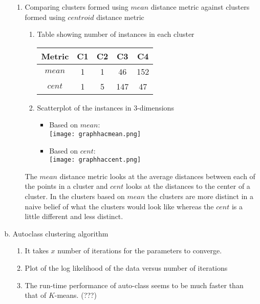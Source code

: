 \documentclass[11pt]{article}
\begin{document}
\begin{enumerate}[a.]
\begin{enumerate}
\item Comparing clusters formed using $mean$ distance metric against clusters formed using $centroid$ distance metric
\begin{enumerate}
\item Table showing number of instances in each cluster\\
\begin{tabular}{|c|c|c|c|c|}
\hline
Metric & C1 & C2 & C3 & C4\\ \hline
$mean$ & 1 & 1 & 46 & 152\\ \hline
$cent$ & 1 & 5 & 147 & 47\\
\hline
\end{tabular}
\item Scatterplot of the instances in 3-dimensions
\begin{itemize}
	\item Based on $mean$:\\
	\texttt{[image: graphhacmean.png]}
	\item Based on $cent$:\\
	\texttt{[image: graphhaccent.png]}
	\end{itemize}
\end{enumerate}
The $mean$ distance metric looks at the average distances between each of the points in a cluster and $cent$ looks at the distances to the center of a cluster. In the clusters based on $mean$ the clusters are more distinct in a naive belief of what the clusters would look like whereas the $cent$ is a little different and less distinct.
\end{enumerate}

\item Autoclass clustering algorithm
\begin{enumerate}
\item It takes $x$ number of iterations for the parameters to converge.
\item Plot of the log likelihood of the data versus number of iterations
\item The run-time performance of auto-class seems to be much faster than that of $K$-means. (???)
\end{enumerate}
\end{enumerate}
\end{document}
